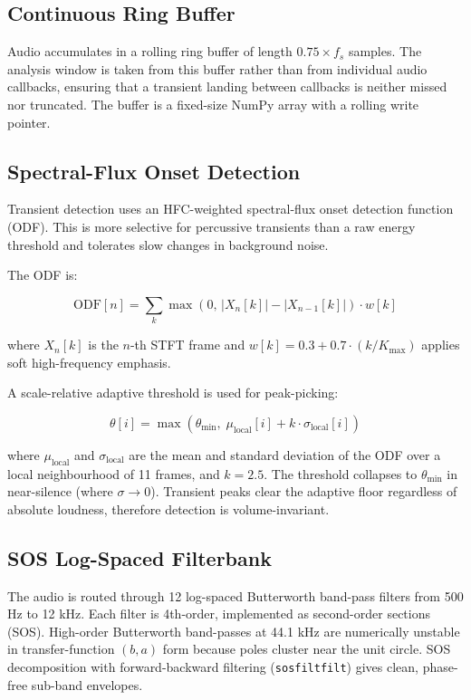 \documentclass[12pt,a4paper]{article}
\begin{document}
\subsection{Continuous Ring Buffer}

Audio accumulates in a rolling ring buffer of length \(0.75 \times f_s\) samples. The analysis window is taken from this buffer rather than from individual audio callbacks, ensuring that a transient landing between callbacks is neither missed nor truncated. The buffer is a fixed-size NumPy array with a rolling write pointer.

\subsection{Spectral-Flux Onset Detection}

Transient detection uses an HFC-weighted spectral-flux onset detection function (ODF). This is more selective for percussive transients than a raw energy threshold and tolerates slow changes in background noise.

The ODF is:

\[
\text{ODF}[n] = \sum_{k} \max\left(0,\, |X_n[k]| - |X_{n-1}[k]|\right) \cdot w[k]
\]

where \(X_n[k]\) is the \(n\)-th STFT frame and \(w[k] = 0.3 + 0.7 \cdot (k / K_{\text{max}})\) applies soft high-frequency emphasis.

A scale-relative adaptive threshold is used for peak-picking:

\[
\theta[i] = \max\left(\theta_{\min},\; \mu_{\text{local}}[i] + k \cdot \sigma_{\text{local}}[i]\right)
\]

where \(\mu_{\text{local}}\) and \(\sigma_{\text{local}}\) are the mean and standard deviation of the ODF over a local neighbourhood of 11 frames, and \(k = 2.5\). The threshold collapses to \(\theta_{\min}\) in near-silence (where \(\sigma \rightarrow 0\)). Transient peaks clear the adaptive floor regardless of absolute loudness, therefore detection is volume-invariant.

\subsection{SOS Log-Spaced Filterbank}

The audio is routed through 12 log-spaced Butterworth band-pass filters from 500 Hz to 12 kHz. Each filter is 4th-order, implemented as second-order sections (SOS). High-order Butterworth band-passes at 44.1 kHz are numerically unstable in transfer-function \((b, a)\) form because poles cluster near the unit circle. SOS decomposition with forward-backward filtering (\texttt{sosfiltfilt}) gives clean, phase-free sub-band envelopes.
\end{document}
